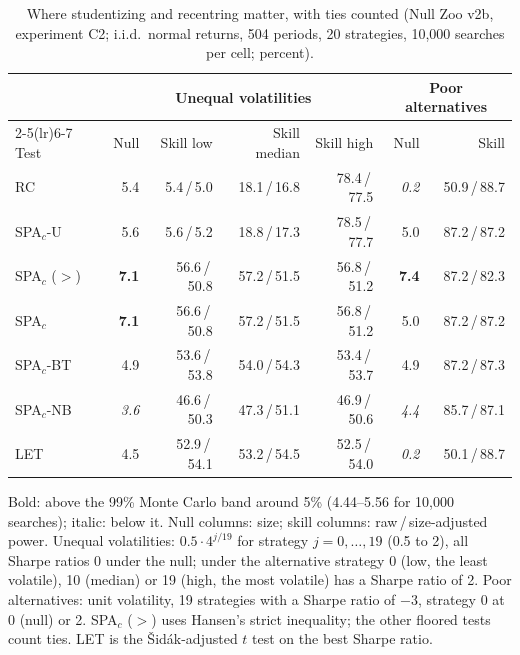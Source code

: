 \begin{table}[t]
\centering
\footnotesize
\setlength{\tabcolsep}{3.5pt}
\caption{Where studentizing and recentring matter, with ties counted (Null Zoo v2b, experiment C2; i.i.d.\ normal returns, 504 periods, 20 strategies, 10{,}000 searches per cell; percent).}
\label{tab:fair2}
\begin{tabular}{lrrrrrr}
\toprule
 & \multicolumn{4}{c}{Unequal volatilities} & \multicolumn{2}{c}{Poor alternatives} \\
\cmidrule(lr){2-5}\cmidrule(lr){6-7}
Test & Null & Skill low & Skill median & Skill high & Null & Skill \\
\midrule
RC & 5.4 & 5.4\,/\,5.0 & 18.1\,/\,16.8 & 78.4\,/\,77.5 & \textit{0.2} & 50.9\,/\,88.7 \\
SPA$_c$-U & 5.6 & 5.6\,/\,5.2 & 18.8\,/\,17.3 & 78.5\,/\,77.7 & 5.0 & 87.2\,/\,87.2 \\
SPA$_c$ ($>$) & \textbf{7.1} & 56.6\,/\,50.8 & 57.2\,/\,51.5 & 56.8\,/\,51.2 & \textbf{7.4} & 87.2\,/\,82.3 \\
SPA$_c$ & \textbf{7.1} & 56.6\,/\,50.8 & 57.2\,/\,51.5 & 56.8\,/\,51.2 & 5.0 & 87.2\,/\,87.2 \\
SPA$_c$-BT & 4.9 & 53.6\,/\,53.8 & 54.0\,/\,54.3 & 53.4\,/\,53.7 & 4.9 & 87.2\,/\,87.3 \\
SPA$_c$-NB & \textit{3.6} & 46.6\,/\,50.3 & 47.3\,/\,51.1 & 46.9\,/\,50.6 & \textit{4.4} & 85.7\,/\,87.1 \\
LET & 4.5 & 52.9\,/\,54.1 & 53.2\,/\,54.5 & 52.5\,/\,54.0 & \textit{0.2} & 50.1\,/\,88.7 \\
\bottomrule
\end{tabular}
\par\smallskip\begin{minipage}{0.97\linewidth}\footnotesize Bold: above the 99\% Monte Carlo band around 5\% (4.44--5.56 for 10{,}000 searches); italic: below it. Null columns: size; skill columns: raw\,/\,size-adjusted power. Unequal volatilities: $0.5\cdot4^{j/19}$ for strategy $j=0,\dots,19$ (0.5 to 2), all Sharpe ratios 0 under the null; under the alternative strategy 0 (low, the least volatile), 10 (median) or 19 (high, the most volatile) has a Sharpe ratio of 2. Poor alternatives: unit volatility, 19 strategies with a Sharpe ratio of $-3$, strategy 0 at 0 (null) or 2. SPA$_c$ ($>$) uses Hansen's strict inequality; the other floored tests count ties. LET is the \v{S}id\'ak-adjusted $t$ test on the best Sharpe ratio.\end{minipage}
\end{table}

